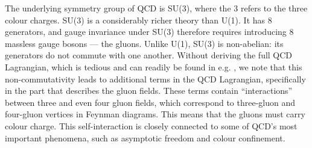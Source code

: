 

  The underlying symmetry group of QCD is SU(3), where the 3 refers to the three colour charges. SU(3) is a considerably richer theory than U(1). It has 8 generators, and gauge invariance under SU(3) therefore requires introducing 8 massless gauge bosons — the gluons. Unlike U(1), SU(3) is non-abelian: its generators do not commute with one another. Without deriving the full QCD Lagrangian, which is tedious and can readily be found in e.g. \cite{LectureNotesQCD}, we note that this non-commutativity leads to additional terms in the QCD Lagrangian, specifically in the part that describes the gluon fields. These terms contain ``interactions'' between three and even four gluon fields, which correspond to three-gluon and four-gluon vertices in Feynman diagrams. This means that the gluons must carry colour charge. This self-interaction is closely connected to some of QCD's most important phenomena, such as asymptotic freedom and colour confinement.

